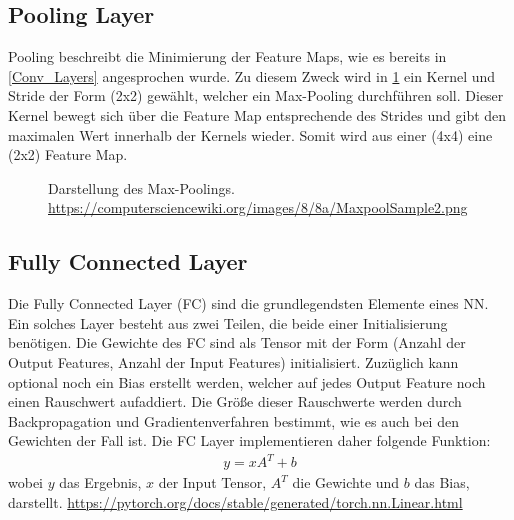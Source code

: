 \subsection{Pooling Layer} \label{Pooling_Layer}
Pooling beschreibt die Minimierung der Feature Maps, wie es bereits in \ref{Conv_Layers} angesprochen wurde. Zu diesem Zweck wird in \ref{fig:Maxpool} ein Kernel und Stride der Form (2x2) gewählt, welcher ein Max-Pooling durchführen soll. Dieser Kernel bewegt sich über die Feature Map entsprechende des Strides und gibt den maximalen Wert innerhalb der Kernels wieder. Somit wird aus einer (4x4) eine (2x2) Feature Map. \cite[S. 379 ff.]{DL}

\begin{figure}[H]
	\centering
	\def\svgscale{1.70}
	
	\caption[Darstellung MaxPooling]{Darstellung des Max-Poolings. \url{https://computersciencewiki.org/images/8/8a/MaxpoolSample2.png}}
	\label{fig:Maxpool}
\end{figure}

\subsection{Fully Connected Layer} \label{FC_Layers}
Die Fully Connected Layer (FC) sind die grundlegendsten Elemente eines NN. Ein solches Layer besteht aus zwei Teilen, die beide einer Initialisierung benötigen.
Die Gewichte des FC sind als Tensor mit der Form (Anzahl der Output Features, Anzahl der Input Features) initialisiert. Zuzüglich kann optional noch ein Bias erstellt werden, welcher auf jedes Output Feature noch einen Rauschwert aufaddiert. Die Größe dieser Rauschwerte werden durch Backpropagation und Gradientenverfahren bestimmt, wie es auch bei den Gewichten der Fall ist. Die FC Layer implementieren daher folgende Funktion:
\begin{align}
	y = xA^T + b
\end{align}
wobei $y$ das Ergebnis, $x$ der Input Tensor, $A^T$ die Gewichte und $b$ das Bias, darstellt. \url{https://pytorch.org/docs/stable/generated/torch.nn.Linear.html}

